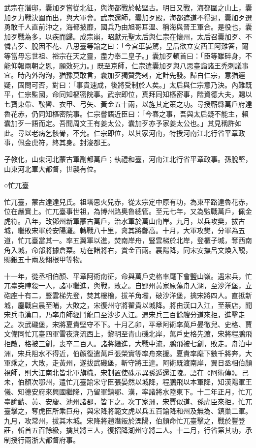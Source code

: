 \begin{pinyinscope}
 武宗在潛邸，囊加歹嘗從北征，與海都戰於帖堅古。明日又戰，海都圍之山上，囊加歹力戰決圍而出，與大軍會。武宗還師，囊加歹殿，海都遮道不得過，囊加歹選勇敢千人直前沖之，海都披靡，國兵乃由旭哥耳溫、稱海與晉王軍合。是役也，囊加歹戰為多，以疾而歸。成宗崩，昭獻元聖太后與仁宗在懷州，太后召囊加歹、不憐吉歹、脫因不花、八思臺等諭之曰：「今宮車晏駕，皇后欲立安西王阿難答，爾等當毋忘世祖、裕宗在天之靈，盡力奉二皇子。」囊加歹頓首曰：「臣等雖碎身，不能仰報兩朝之恩，願效死力。」既至京師，仁宗遣囊加歹與八思臺詣諸王禿剌議事宜。時內外洶洶，猶豫莫敢言，囊加歹獨贊禿剌，定計先發。歸白仁宗，意猶遲疑，固問可否，對曰：「事貴速成，後將受制於人矣。」太后與仁宗意乃決。內難既平，仁宗監國，命同知樞密院事。武宗即位，真拜同知樞密事，階資德大夫，賜以七寶束帶、鞍轡、衣甲、弓矢、黃金五十兩，以旌其定策之功。尋授蘄縣萬戶府達魯花赤，仍同知樞密院事。仁宗嘗語近臣曰：「今春之事，吾與太后疑不能主，賴囊加歹一語而定。吾聞周文王有姜太公，囊加歹亦予家姜太公也。」其見稱許如此。尋以老病乞骸骨，不允。仁宗即位，以其家河南，特授河南江北行省平章政事，佩金虎符，終其身。封浚都王。



 子教化，山東河北蒙古軍副都萬戶；執禮和臺，河南江北行省平章政事。孫脫堅，山東河北軍大都督，世襲有位。



 ○忙兀臺



 忙兀臺，蒙古達達兒氏。祖塔思火兒赤，從太宗定中原有功，為東平路達魯花赤，位在嚴實上。忙兀臺事世祖，為博州路奧魯總管。至元七年，又為監戰萬戶，佩金虎符。八年，改鄧州新軍蒙古萬戶，治水軍於萬山南岸。九月，以兵攻樊，拔古城，繼敗宋軍於安陽灘。轉戰八十里，禽其將鄭高。十月，大軍攻樊，分軍為五道，忙兀臺當其一。率五翼軍以進，焚南岸舟，豎雲梯於北岸，登櫃子城，奪西南角入城，命部將據倉粟。功在諸將右，賞金百兩。襄陽降，同宋安撫呂文煥入覲，賜銀五十兩及翎根甲等物。



 十一年，從丞相伯顏、平章阿術南征，命與萬戶史格率麾下會鹽山嶺。遇宋兵，忙兀臺突陣殺一人，諸軍繼進，與戰，敗之。自郢州黃家原蕩舟入湖，至沙洋堡，立砲座十有二，豎雲梯先登，焚其樓櫓，拔羊角壩，破沙洋堡，擒宋將四人。直抵新城，鏖戰自晨至晡，大敗之，宋復州守將翟貴以城降。將由漢口入江，至蔡店，聞宋兵屯漢口，乃率舟師經鬥龍口至沙步入江。遇宋兵三百餘艘分道來拒，進擊走之。次武磯堡，宋將夏貴堅守不下。十月乙卯，平章阿術率萬戶晏徹兒、史格、賈文備同忙兀臺四軍雪夜溯流西上，黎明至青山磯北岸，萬戶史格先渡，宋將程鵬飛拒敵，格被三創，喪卒二百人。諸將繼進，大戰中流，鵬飛被七創，敗走。舟泊中洲，宋兵阻水不得近，伯顏復遣萬戶張榮實等率舟來援。夏貴率麾下數千將奔，大軍乘之，大敗，走黃州，遂拔武磯堡，斬守將王達。阿術既渡南岸，翼日丞相伯顏視師，則大江南北皆北軍旗幟，宋制置使硃示異孫遁還江陵。語在《阿術傳》。己未，伯顏次鄂州，遣忙兀臺諭宋守臣張晏然以城降，程鵬飛以本軍降，知漢陽軍王儀、知德安府來興國繼降，乃留軍鎮鄂、漢，率諸將水陸東下。十二年正月，忙兀臺諭蘄、黃、安慶、池州諸郡，皆下之。次丁家洲，宋賈似道、孫虎臣來拒，忙兀臺擊之，奪虎臣所乘巨舟，與宋降將範文虎以兵五百諭降和州及無為、鎮巢二軍。九月，攻常州，拔其木城。宋降將趙潛叛於溧陽，伯顏命忙兀臺擊之，戰於豐登莊，斬首五百餘級，擒其將三人，復招降湖州守將二人。十二月，行省第其功，承制授行兩浙大都督府事。




\end{pinyinscope}
